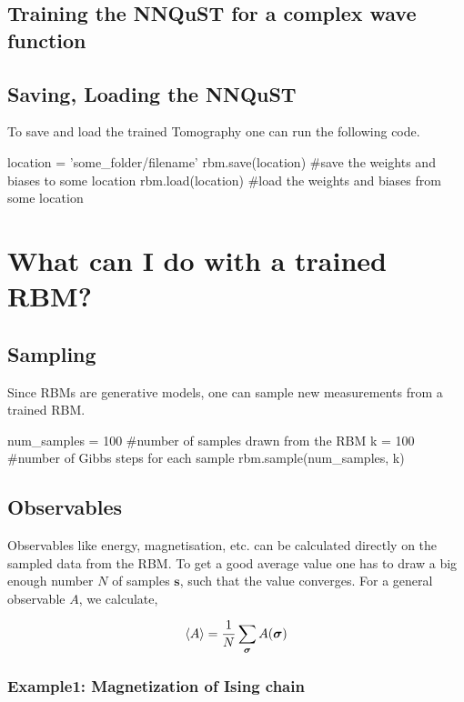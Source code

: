 \documentclass[submission, Phys]{SciPost}
\begin{document}
\subsection{Training the NNQuST for a complex wave function}


\subsection{Saving, Loading the NNQuST}

To save and load the trained Tomography one can run the following code.

\begin{python}
location = 'some_folder/filename'
rbm.save(location) #save the weights and biases to some location
rbm.load(location) #load the weights and biases from some location
\end{python}

\section{What can I do with a trained RBM?}

\subsection{Sampling}

Since RBMs are generative models, one can sample new measurements from a trained RBM.

\begin{python}
num_samples = 100 #number of samples drawn from the RBM
k = 100 #number of Gibbs steps for each sample
rbm.sample(num_samples, k)
\end{python}

\subsection{Observables}

Observables like energy, magnetisation, etc. can be calculated directly on the sampled data from the RBM. To get a good average value one has to draw a big enough number $N$ of samples $\bm{s}$, such that the value converges. For a general observable $A$, we calculate,

\begin{equation}
\braket{A} = \frac{1}{N} \sum_{\bm{\sigma}} A(\bm{\sigma})
\end{equation}

\subsubsection{Example1: Magnetization of Ising chain}
\end{document}
